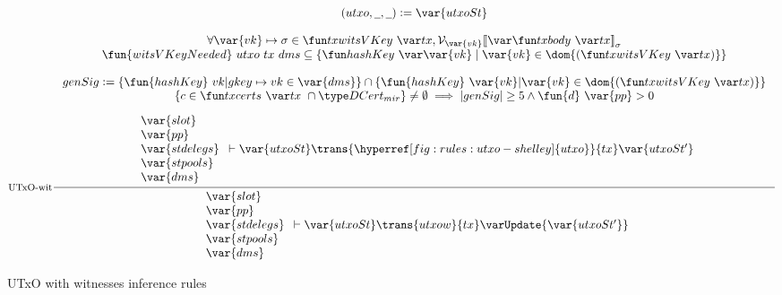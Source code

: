 \begin{figure}
  \begin{equation}
    \label{eq:utxo-witness-inductive-shelley}
    \inference[UTxO-wit]
    {
      (utxo, \wcard, \wcard) \leteq \var{utxoSt} \\~\\
      \forall \var{vk} \mapsto \sigma \in \txwitsVKey{tx},
      \mathcal{V}_{\var{vk}}{\serialised{\txbody{tx}}}_{\sigma} \\
      \fun{witsVKeyNeeded}~{utxo}~{tx}~{dms} \subseteq \{ \hashKey \var{vk} \mid
      \var{vk}\in\dom{(\txwitsVKey{tx})} \}
      \\~\\
      genSig \leteq
      \left\{
        \fun{hashKey}~vk \vert gkey\mapsto vk \in\var{dms}
      \right\}
      \cap
      \left\{
        \fun{hashKey}~\var{vk} \vert \var{vk}\in\dom{(\txwitsVKey{tx})}
      \right\}
      \\
      \left\{
        c\in\txcerts{tx}~\cap\DCertMir
      \right\} \neq\emptyset \implies \vert genSig\vert \geq 5 \wedge
      \fun{d}~\var{pp} > 0
      \\~\\
      {
        \begin{array}{l}
          \var{slot}\\
          \var{pp}\\
          \var{stdelegs}\\
          \var{stpools}\\
          \var{dms}\\
        \end{array}
      }
      \vdash \var{utxoSt} \trans{\hyperref[fig:rules:utxo-shelley]{utxo}}{tx}
      \var{utxoSt'}\\
    }
    {
      \begin{array}{l}
        \var{slot}\\
        \var{pp}\\
        \var{stdelegs}\\
        \var{stpools}\\
        \var{dms}\\
      \end{array}
      \vdash \var{utxoSt} \trans{utxow}{tx} \varUpdate{\var{utxoSt'}}
    }
  \end{equation}
  \caption{UTxO with witnesses inference rules}
  \label{fig:rules:utxow-shelley}
\end{figure}


\clearpage
